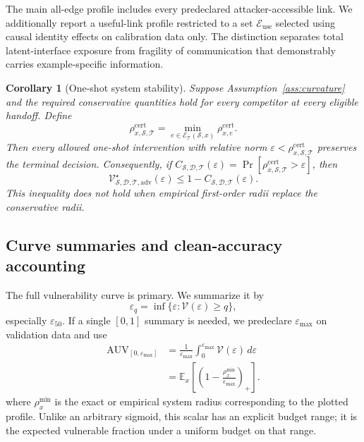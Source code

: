 \documentclass[11pt]{article}
\newtheorem{corollary}[theorem]{Corollary}
\DeclareMathOperator{\AUV}{AUV}
\newcommand{\E}{\mathbb E}
\newcommand{\eps}{\varepsilon}
\newcommand{\Vuln}{\mathcal V}
\newcommand{\sys}{\mathcal S}
\newcommand{\threat}{\mathcal T}
\begin{document}
The main all-edge profile includes every predeclared attacker-accessible link.
We additionally report a useful-link profile restricted to a set
\(\mathcal E_{\mathrm{use}}\) selected using causal identity effects on
calibration data only. The distinction separates total latent-interface
exposure from fragility of communication that demonstrably carries
example-specific information.

\begin{corollary}[One-shot system stability]
\label{cor:system-stability}
Suppose Assumption~\ref{ass:curvature} and the required conservative quantities
hold for every competitor at every eligible handoff. Define
\begin{equation}
    \rho^{\mathrm{cert}}_{x,\sys,\threat}
    =
    \min_{e\in\mathcal E_{\threat}(\sys,x)}
    \rho^{\mathrm{cert}}_{x,e}.
\end{equation}
Then every allowed one-shot intervention with relative norm
\(\eps<\rho^{\mathrm{cert}}_{x,\sys,\threat}\) preserves the terminal
decision. Consequently, if
\(C_{\sys,\mathcal D,\threat}(\eps)
=\Pr[\rho^{\mathrm{cert}}_{x,\sys,\threat}>\eps]\), then
\begin{equation}
    \Vuln^\star_{\sys,\mathcal D,\threat,\mathrm{adv}}(\eps)
    \le 1-C_{\sys,\mathcal D,\threat}(\eps).
\end{equation}
This inequality does not hold when empirical first-order radii replace the
conservative radii.
\end{corollary}

\subsection{Curve summaries and clean-accuracy accounting}

The full vulnerability curve is primary. We summarize it by
\begin{equation}
    \eps_q=\inf\{\eps:\Vuln(\eps)\ge q\},
\end{equation}
especially \(\eps_{50}\). If a single \([0,1]\) summary is needed, we
predeclare \(\eps_{\max}\) on validation data and use
\begin{align}
    \AUV_{[0,\eps_{\max}]}
    &=\frac{1}{\eps_{\max}}
    \int_0^{\eps_{\max}}\Vuln(\eps)\,d\eps \\
    &=\E_x\!\left[
    \left(1-\frac{\rho^{\min}_x}{\eps_{\max}}\right)_+
    \right].
    \label{eq:auv}
\end{align}
where \(\rho_x^{\min}\) is the exact or empirical system radius corresponding
to the plotted profile.
Unlike an arbitrary sigmoid, this scalar has an explicit budget range; it is
the expected vulnerable fraction under a uniform budget on that range.
\end{document}

